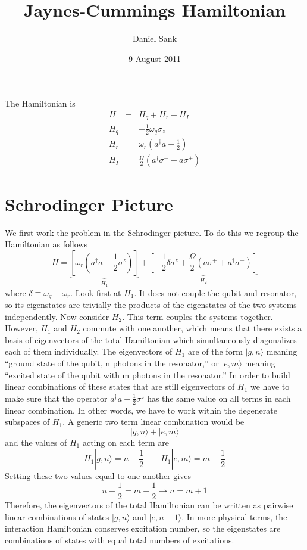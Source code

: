 \documentclass[twocolumn]{article}
\title{Jaynes-Cummings Hamiltonian}
\author{Daniel Sank}
\date{9 August 2011}
\begin{document}
\maketitle
The Hamiltonian is\begin{eqnarray*}
H & = & H_{q}+H_{r}+H_{I}\\
H_{q} & = & -\frac{1}{2}\omega_{q}\sigma_{z}\\
H_{r} & = & \omega_{r}\left(a^{\dagger}a+\frac{1}{2}\right)\\
H_{I} & = & \frac{\Omega}{2}\left(a^{\dagger}\sigma^{-}+a\sigma^{+}\right)\end{eqnarray*}



\section{Schrodinger Picture}

We first work the problem in the Schrodinger picture. To do this we
regroup the Hamiltonian as follows\[
H=\underbrace{\left[\omega_{r}\left(a^{\dagger}a-\frac{1}{2}\sigma^{z}\right)\right]}_{H_{1}}+\underbrace{\left[-\frac{1}{2}\delta\sigma^{z}+\frac{\Omega}{2}\left(a\sigma^{+}+a^{\dagger}\sigma^{-}\right)\right]}_{H_{2}}\]
where $\delta\equiv\omega_{q}-\omega_{r}$. Look first at $H_{1}$.
It does not couple the qubit and resonator, so its eigenstates are
trivially the products of the eigenstates of the two systems independently.
Now consider $H_{2}$. This term couples the systems together. However,
$H_{1}$ and $H_{2}$ commute with one another, which means that there
exists a basis of eigenvectors of the total Hamiltonian which simultaneously
diagonalizes each of them individually. The eigenvectors of $H_{1}$
are of the form $|g,n\rangle$ meaning {}``ground state of the qubit,
n photons in the resonator,'' or $|e,m\rangle$ meaning {}``excited
state of the qubit with m photons in the resonator.'' In order to
build linear combinations of these states that are still eigenvectors
of $H_{1}$ we have to make sure that the operator $a^{\dagger}a+\frac{1}{2}\sigma^{z}$
has the same value on all terms in each linear combination. In other
words, we have to work within the degenerate subspaces of $H_{1}$.
A generic two term linear combination would be\[
|g,n\rangle+|e,m\rangle\]
and the values of $H_{1}$ acting on each term are\[
H_{1}|g,n\rangle=n-\frac{1}{2}\qquad H_{1}|e,m\rangle=m+\frac{1}{2}\]
Setting these two values equal to one another gives\[
n-\frac{1}{2}=m+\frac{1}{2}\longrightarrow n=m+1\]
Therefore, the eigenvectors of the total Hamiltonian can be written
as pairwise linear combinations of states $|g,n\rangle$ and $|e,n-1\rangle$.
In more physical terms, the interaction Hamiltonian conserves excitation
number, so the eigenstates are combinations of states with equal total
numbers of excitations.
\end{document}
